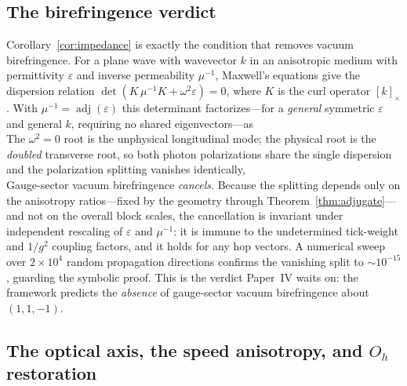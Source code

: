 \subsection{The birefringence verdict}
\label{subsec:birefringence}

Corollary~\ref{cor:impedance} is exactly the condition that removes vacuum
birefringence. For a plane wave with wavevector $k$ in an anisotropic medium with
permittivity $\varepsilon$ and inverse permeability $\mu^{-1}$, Maxwell's
equations give the dispersion relation $\det(K\,\mu^{-1}K+\omega^2\varepsilon)=0$,
where $K$ is the curl operator $[k]_\times$. With $\mu^{-1}=\operatorname{adj}
(\varepsilon)$ this determinant factorizes---for a \emph{general} symmetric
$\varepsilon$ and general $k$, requiring no shared eigenvectors---as
%
\begin{equation}
    \label{eq:dispersion}
    
\end{equation}
%
The $\omega^2=0$ root is the unphysical longitudinal mode; the physical root is
the \emph{doubled} transverse root, so both photon polarizations share the single
dispersion
%
\begin{equation}
    \label{eq:shared_dispersion}
    
\end{equation}
%
and the polarization splitting vanishes identically,
%
\begin{equation}
    \label{eq:split}
    
\end{equation}
%
Gauge-sector vacuum birefringence \emph{cancels}. Because the splitting depends
only on the anisotropy ratios---fixed by the geometry through
Theorem~\ref{thm:adjugate}---and not on the overall block scales, the cancellation
is invariant under independent rescaling of $\varepsilon$ and $\mu^{-1}$: it is
immune to the undetermined tick-weight and $1/g^2$ coupling factors, and it holds
for any hop vectors. A numerical sweep over $2\times10^4$ random propagation
directions confirms the vanishing split to $\sim10^{-15}$, guarding the symbolic
proof. This is the verdict Paper~IV waits on: the framework predicts the
\emph{absence} of gauge-sector vacuum birefringence about $(1,1,-1)$.

\subsection{The optical axis, the speed anisotropy, and \texorpdfstring{$O_h$}{Oh}
restoration}
\label{subsec:scope_verdict}

